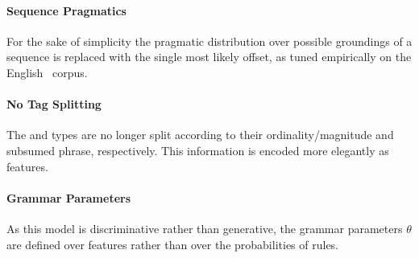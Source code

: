 \paragraph{Sequence Pragmatics}
For the sake of simplicity the pragmatic distribution over
  possible groundings of a sequence is replaced with the single most likely
  offset, as tuned empirically on the English \tempeval\ corpus.

\paragraph{No Tag Splitting}
The  and  types are no longer split according to their
  ordinality/magnitude and subsumed phrase, respectively.
This information is encoded more elegantly as features.

\paragraph{Grammar Parameters}
As this model is discriminative rather than generative, the grammar
  parameters $\theta$ are defined over features rather than over the
  probabilities of rules.
